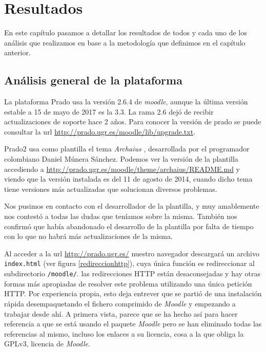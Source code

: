 \chapter{Resultados}

En este capítulo pasamos a detallar los resultados de todos y cada uno de los análisis que realizamos en base a la metodología que definimos en el capítulo anterior.

\section{Análisis general de la plataforma}

La plataforma Prado usa la versión 2.6.4 de \textit{moodle}, aunque la última versión estable a 15 de mayo de 2017 es la 3.3. La rama 2.6 dejó de recibir actualizaciones de soporte hace 2 años. Para conocer la versión de prado se puede consultar la url \url{http://prado.ugr.es/moodle/lib/upgrade.txt}.

\bigskip
Prado2 usa como plantilla el tema \textit{Archaius} \cite{moodletheme}, desarrollada por el programador colombiano Daniel Múnera Sánchez. Podemos ver la versión de la plantilla accediendo a \url{http://prado.ugr.es/moodle/theme/archaius/README.md} y viendo que la versión instalada es del 11 de agosto de 2014, cuando dicho tema tiene versiones más actualizadas que solucionan diversos problemas.

\bigskip
Nos pusimos en contacto con el desarrollador de la plantilla, y muy amablemente nos contestó a todas las dudas que teníamos sobre la misma. También nos confirmó que había abandonado el desarrollo de la plantilla por falta de tiempo con lo que no habrá más actualizaciones de la misma.

\bigskip
Al acceder a la url \url{http://prado.ugr.es/} nuestro navegador descargará un archivo \texttt{index.html} (ver figura \ref{redireccionhttp}), cuya única función es redireccionar al subdirectorio \texttt{/moodle/}. las redirecciones HTTP están desaconsejadas y hay otras formas más apropiadas de resolver este problema utilizando una única petición HTTP. Por experiencia propia, esto deja entrever que se partió de una instalación rápida desempaquetando el fichero comprimido de \textit{Moodle} y empezando a trabajar desde ahí. A primera vista, parece que se ha hecho así para hacer referencia a que se está usando el paquete \textit{Moodle} pero se han eliminado todas las referencias al mismo, incluso los enlaces a su licencia, cosa a la que obliga la GPLv3, licencia de \textit{Moodle}.

